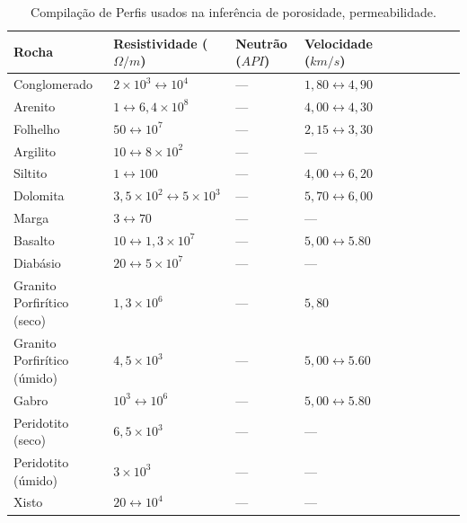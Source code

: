 \begin{table}[H]
	\centering
	\caption{Compilação de Perfis usados na inferência de porosidade, permeabilidade.}
	\label{rock-properties2}
	\begin{tabular}{@{}llllllllll@{}}
		\toprule
		Rocha   & Resistividade ($\Omega/m$) &  Neutrão ($API$) & Velocidade ($km/s$)  &    \\ \midrule
		Conglomerado &    $2\times10^{3}\leftrightarrow10^{4}$       &    ---           &     $1,80\leftrightarrow4,90$       &     \\
		Arenito  &    $1\leftrightarrow6,4\times10^{8}$       &      ---         &     $4,00\leftrightarrow4,30$       &   \\
		Folhelho &     $50\leftrightarrow10^{7}$      &      ---         &      $2,15\leftrightarrow3,30$      &   \\
		Argilito &     $10\leftrightarrow8\times10^{2}$      &       ---        &     ---       &      \\
		Siltito  &      $1\leftrightarrow100$     &      ---         &         $4,00\leftrightarrow6,20$    &         \\
		Dolomita &   $3,5\times10^{2}\leftrightarrow5\times10^{3}$        &    ---           &      $5,70\leftrightarrow6,00$      &      \\
		Marga  &     $3\leftrightarrow70$      &     ---          &     ---       &     \\
		Basalto  &     $10\leftrightarrow1,3\times10^{7}$      &     ---          &     $ 5,00\leftrightarrow5.80$         &     \\
		Diabásio &  $20\leftrightarrow5\times10^{7}$         &      ---         &     ---       &  \\
		Granito Porfirítico (seco) &     $1,3\times10^{6}$     &       ---        &     $5,80$       &    \\
		Granito Porfirítico (úmido) &  $4,5\times10^{3}$          &      ---         &     $ 5,00\leftrightarrow5.60$         &      \\
		Gabro &   $10^{3}\leftrightarrow10^{6}$       &      ---         &      $ 5,00\leftrightarrow5.80$        &     \\
		Peridotito (seco) &   $6,5\times10^{3}$        &    ---           &       ---     &    \\
		Peridotito (úmido) &    $3\times10^{3}$       &      ---         &      ---      &  \\
		Xisto &    $20\leftrightarrow10^{4}$       &        ---       &       ---     &   \\

\end{tabular}
\end{table}
